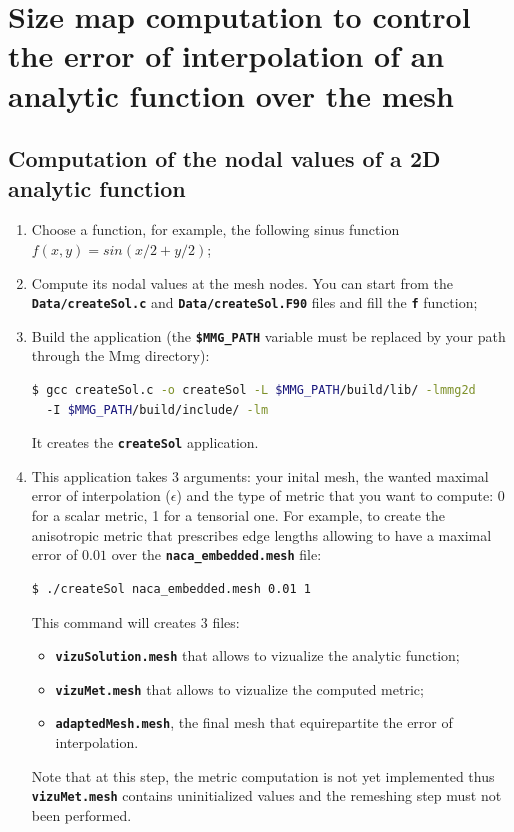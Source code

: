 \documentclass{article}
\newcommand{\ttb}[1]{\texttt{\textbf{#1}}}
\begin{document}
\section{Size map computation to control the error of interpolation of an
  analytic function over the mesh\label{error_interp}}
\subsection{Computation of the nodal values of a 2D analytic function}
\begin{enumerate}
\item Choose a function, for example, the following sinus function
  $f(x,y) = sin(x/2+y/2)$;
\item Compute its nodal values at the mesh nodes. You can start from
  the \ttb{Data/createSol.c} and \ttb{Data/createSol.F90} files and
  fill the \ttb{f} function;
\item Build the application (the \ttb{\$MMG\_PATH} variable must be
  replaced by your path through the Mmg directory):
\begin{lstlisting}[language=bash]
$ gcc createSol.c -o createSol -L $MMG_PATH/build/lib/ -lmmg2d
  -I $MMG_PATH/build/include/ -lm
\end{lstlisting}
It creates the \ttb{createSol} application.
\item This application takes 3 arguments: your inital mesh, the wanted
  maximal error of interpolation ($\epsilon$) and the type of metric
  that you want to compute: 0 for a scalar metric, 1 for a tensorial
  one. For example, to create the anisotropic metric that prescribes
  edge lengths allowing to have a maximal error of $0.01$ over the
  \ttb{naca\_embedded.mesh} file:
\begin{lstlisting}[language=bash]
  $ ./createSol naca_embedded.mesh 0.01 1
\end{lstlisting}
This command will creates 3 files:
\begin{itemize}
\item \ttb{vizuSolution.mesh} that allows to vizualize the analytic function;
\item \ttb{vizuMet.mesh} that allows to vizualize the computed metric;
\item \ttb{adaptedMesh.mesh}, the final mesh that equirepartite the
  error of interpolation.
\end{itemize}
Note that at this step, the metric computation is not yet implemented
thus \ttb{vizuMet.mesh} contains uninitialized values and the
remeshing step must not been performed.

\end{enumerate}
\end{document}

